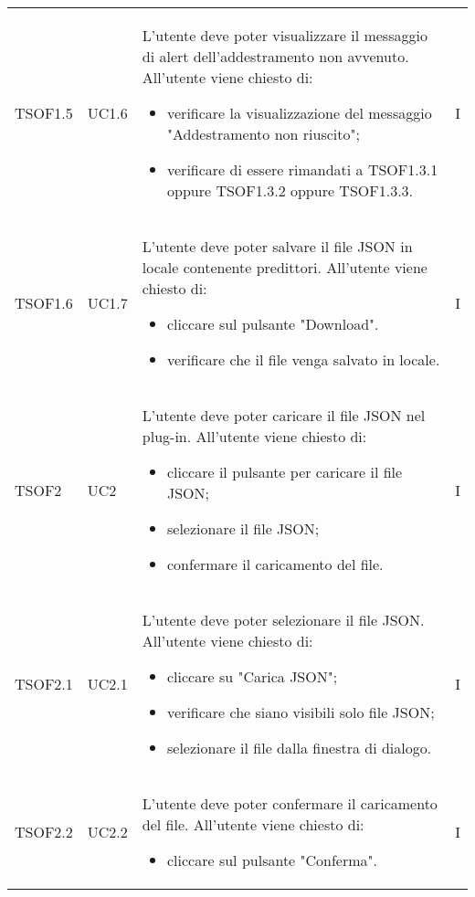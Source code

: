\begin{longtable}{C{2.5cm} C{2.5cm} L{8cm} C{2cm}}
TSOF1.5 & UC1.6 & 
L'utente deve poter visualizzare il messaggio di alert dell'addestramento non avvenuto. \newline All'utente viene chiesto di:
\begin{itemize}
	\item verificare la visualizzazione del messaggio "Addestramento non riuscito";
	\item verificare di essere rimandati a TSOF1.3.1 oppure TSOF1.3.2 oppure TSOF1.3.3.
\end{itemize} & I \\

TSOF1.6 & UC1.7 & 
L'utente deve poter salvare il file JSON in locale contenente predittori. \newline All'utente viene chiesto di:
\begin{itemize}
	\item cliccare sul pulsante "Download".
	\item verificare che il file venga salvato in locale.
\end{itemize} & I \\

TSOF2 & UC2 &
L'utente deve poter caricare il file JSON nel plug-in. \newline All'utente viene chiesto di:
\begin{itemize}
	\item cliccare il pulsante per caricare il file JSON;
	\item selezionare il file JSON;
	\item confermare il caricamento del file.
\end{itemize} & I	\\

TSOF2.1 & UC2.1 &
L'utente deve poter selezionare il file JSON. \newline All'utente viene chiesto di:
\begin{itemize}
	\item cliccare su "Carica JSON";
	\item verificare che siano visibili solo file JSON;
	\item selezionare il file dalla finestra di dialogo.
\end{itemize} & I	\\

TSOF2.2 & UC2.2 &
L'utente deve poter confermare il caricamento del file. \newline All'utente viene chiesto di:
\begin{itemize}
	\item cliccare sul pulsante "Conferma".
\end{itemize} & I	\\


\end{longtable}
